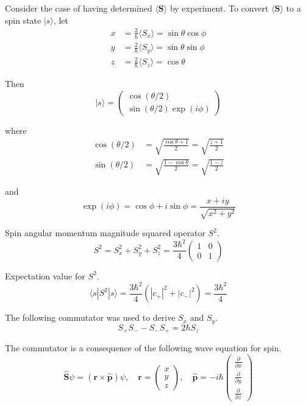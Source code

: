 Consider the case of having determined $\langle\mathbf S\rangle$ by experiment.
To convert $\langle\mathbf S\rangle$ to a spin state $|s\rangle$, let
\begin{align*}
x&=\frac{2}{\hbar}\langle S_x\rangle=\sin\theta\cos\phi
\\
y&=\frac{2}{\hbar}\langle S_y\rangle=\sin\theta\sin\phi
\\
z&=\frac{2}{\hbar}\langle S_z\rangle=\cos\theta
\end{align*}

Then
\begin{equation*}
|s\rangle=\begin{pmatrix}\cos(\theta/2)\\\sin(\theta/2)\exp(i\phi)\end{pmatrix}
\end{equation*}

where
\begin{align*}
\cos(\theta/2)&=\sqrt{\frac{\cos\theta+1}{2}}=\sqrt{\frac{z+1}{2}}
\\
\sin(\theta/2)&=\sqrt{\frac{1-\cos\theta}{2}}=\sqrt{\frac{1-z}{2}}
\end{align*}

and
\begin{equation*}
\exp(i\phi)=\cos\phi+i\sin\phi=\frac{x+iy}{\sqrt{x^2+y^2}}
\end{equation*}

Spin angular momentum magnitude squared operator $S^2$.
\begin{equation*}
S^2=S_x^2+S_y^2+S_z^2=\frac{3\hbar^2}{4}
\begin{pmatrix}1&0\\0&1\end{pmatrix}
\end{equation*}

Expectation value for $S^2$.
\begin{equation*}
\langle s|S^2|s\rangle=\frac{3\hbar^2}{4}\left(|c_+|^2+|c_-|^2\right)=\frac{3\hbar^2}{4}
\end{equation*}

The following commutator was used to derive $S_x$ and $S_y$.
\begin{equation*}
S_+S_--S_-S_+=2\hbar S_z
\end{equation*}

The commutator is a consequence of the following wave equation for spin.
\begin{equation*}
\hat{\mathbf S}\psi=(\mathbf r\times\hat{\mathbf p})\psi,\quad
\mathbf r=\begin{pmatrix}x\\y\\z\end{pmatrix},\quad
\hat{\mathbf p}=-i\hbar\begin{pmatrix}
\frac{\partial}{\partial x}
\\
\frac{\partial}{\partial y}
\\
\frac{\partial}{\partial z}
\end{pmatrix}
\end{equation*}

